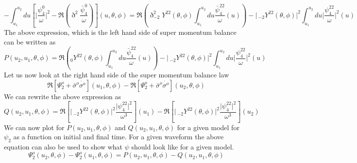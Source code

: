 \documentclass[prd,preprintnumbers,onecolumn,eqsecnum,floatfix,letter]{revtex4}
\begin{document}
\begin{equation}
	-\int_{u_{1}}^{u_{2}} du \left[\bigg|\frac{\psi_{4}^{0}}{\omega}\bigg|^{2} - \Re\left(\eth^{2}\frac{\bar{\psi}_{4}^{0}}{\omega} \right) \right](u, \theta, \phi) = \Re\left(\eth^2 _{-2}Y^{22}(\theta,\phi)\int_{u_{1}}^{u_{2}} du \frac{\bar{\psi}_{4}^{22}}{\omega}(u)\right) - \Bigg|\,_{-2}Y^{22}(\theta,\phi)\Bigg|^2\int_{u_{1}}^{u_{2}} du \bigg|\frac{\psi_{4}^{22}}{\omega}\bigg|^{2}(u)
\end{equation}
The above expression, which is the left hand side of super momentum balance can be written as
\begin{equation}
	P(u_2, u_1, \theta, \phi) =  \Re\left( _{0}Y^{22}(\theta,\phi)\int_{u_{1}}^{u_{2}} du \frac{\bar{\psi}_{4}^{22}}{\omega}(u)\right) - \Bigg|\,_{-2}Y^{22}(\theta,\phi)\Bigg|^2\int_{u_{1}}^{u_{2}} du \bigg|\frac{\psi_{4}^{22}}{\omega}\bigg|^{2}(u)
\end{equation} 
 Let us now look at the right hand side of the super momentum balance law
 \begin{equation}
 	\Re\left[\Psi^{o}_{2} + \bar{\sigma}^{o}\dot{\sigma^{o}}\right]\left(u_{1}, \theta, \phi\right) - \Re\left[\Psi^{o}_{2} + \bar{\sigma}^{o}\dot{\sigma^{o}}\right]\left(u_{2}, \theta, \phi\right) 
 \end{equation}
 We can rewrite the above expression as
 \begin{equation}
 	Q(u_2, u_1, \theta, \phi) = \Re\left[\bigg|\,_{-2}Y^{2 2}(\theta,\phi)\bigg|^{2} \frac{\big|\psi_{4}^{22}\big|^2}{\omega^3}\right]\left(u_{1}\right)- \Re\left[\bigg|\,_{-2}Y^{2 2}(\theta,\phi)\bigg|^{2} \frac{\big|\psi_{4}^{22}\big|^2}{\omega^3}\right]\left(u_{2}\right) 
 \end{equation}
 We can now plot for $P(u_2, u_1, \theta, \phi)$ and $Q(u_2, u_1, \theta, \phi)$ for a given model for $\psi_2$ as a function on initial and final time. For a given waveform the above equation can also be used to show what $\psi$ should look like for a given model. 	
 \begin{equation}
 	\Psi^{o}_{2}\left(u_2, \theta, \phi\right) - \Psi^{o}_{2}\left(u_1, \theta, \phi\right) = P(u_2, u_1, \theta, \phi) - Q(u_2, u_1, \theta, \phi)
 \end{equation}
\end{document}
